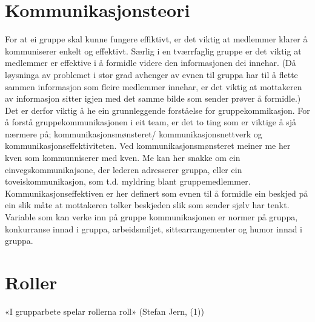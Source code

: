 \section{Kommunikasjonsteori}
%
For at ei gruppe skal kunne fungere effiktivt, er det viktig at medlemmer klarer å kommuniserer enkelt og effektivt. Særlig i en tværrfaglig gruppe er det viktig at medlemmer er effektive i å formidle videre den informasjonen dei innehar. (Då løysninga av problemet i stor grad avhenger av evnen til gruppa har til å flette sammen informasjon som fleire medlemmer innehar, er det viktig at mottakeren av informasjon sitter igjen med det samme bilde som sender prøver å formidle.) Det er derfor viktig å he ein grunnleggende forståelse for gruppekommikasjon.
For å forstå gruppekommunikasjonen i eit team, er det to ting som er viktige å sjå nærmere på; kommunikasjonsmønsteret/ kommunikasjonsnettverk og kommunikasjonseffektiviteten. Ved kommunikasjonsmønsteret meiner me her kven som kommunniserer med kven. Me kan her snakke om ein einvegskommunikajsone, der lederen adresserer gruppa, eller ein toveiskommunikasjon, som t.d. myldring blant gruppemedlemmer. Kommunikasjonseffektiven er her definert som evnen til å formidle ein beskjed på ein slik måte at mottakeren tolker beskjeden slik som sender sjølv har tenkt.
Variable som kan verke inn på gruppe kommunikasjonen er normer på gruppa, konkurranse innad i gruppa, arbeidsmiljet, sittearrangementer og humor innad i gruppa.
\\
\section{Roller} \label{avs:roller} 
«I grupparbete spelar rollerna roll» (Stefan Jern, (1))\\

